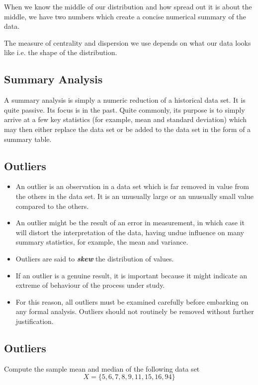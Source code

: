 \documentclass[]{report}
\begin{document}
{When we know the middle of our distribution and how spread out it is about the middle, we have two numbers which create a concise numerical summary of the data. 

The measure of centrality and dispersion we use depends on what our data looks like i.e. the shape of the distribution.



\subsection{Summary Analysis}

A summary analysis is simply a numeric reduction of a historical data set. It is quite passive. Its focus is in the past. Quite commonly, its purpose is to simply arrive at a few key statistics (for example, mean and standard deviation) which may then either replace the data set or be added to the data set in the form of a summary table.

\subsection{Outliers}

\begin{itemize}
\item
An outlier is an observation in a data set which is far removed in value from the others in the data set. It is an unusually large or an unusually small value compared to the others.
\item
An outlier might be the result of an error in measurement, in which case it will distort the interpretation of the data, having undue influence on many summary statistics, for example, the mean and variance.
\item Outliers are said to \textbf{\emph{skew}} the distribution of values.
\item
If an outlier is a genuine result, it is important because it might indicate an extreme of behaviour of the process under study. \item For this reason, all outliers must be examined carefully before embarking on any formal analysis. Outliers should not routinely be removed without further justification.
\end{itemize}
\subsection{Outliers}
Compute the sample mean and median of the following data set
\[X = \{ 5, 6, 7, 8 ,9,11, 15, 16, 94\}\]

}
\end{document}
